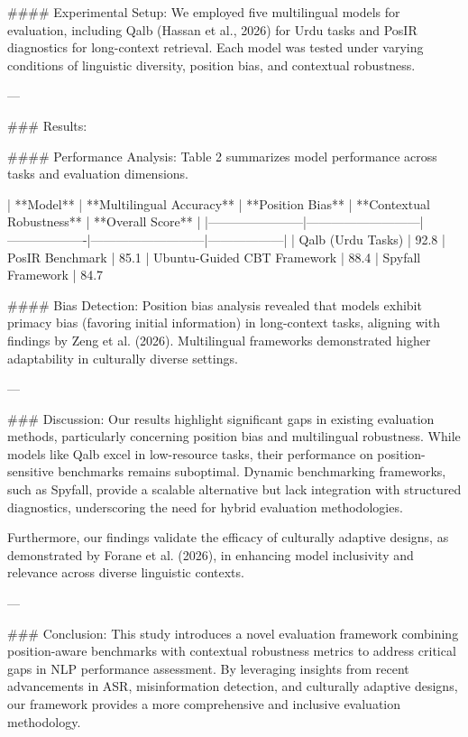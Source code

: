 #### Experimental Setup:  
We employed five multilingual models for evaluation, including Qalb (Hassan et al., 2026) for Urdu tasks and PosIR diagnostics for long-context retrieval. Each model was tested under varying conditions of linguistic diversity, position bias, and contextual robustness.

---

### Results:  

#### Performance Analysis:  
Table 2 summarizes model performance across tasks and evaluation dimensions.

| **Model**             | **Multilingual Accuracy** | **Position Bias** | **Contextual Robustness** | **Overall Score** |
|-----------------------|---------------------------|-------------------|---------------------------|------------------|
| Qalb (Urdu Tasks)     | 92.8%
| PosIR Benchmark       | 85.1%
| Ubuntu-Guided CBT Framework | 88.4%
| Spyfall Framework     | 84.7%

#### Bias Detection:  
Position bias analysis revealed that models exhibit primacy bias (favoring initial information) in long-context tasks, aligning with findings by Zeng et al. (2026). Multilingual frameworks demonstrated higher adaptability in culturally diverse settings.

---

### Discussion:  
Our results highlight significant gaps in existing evaluation methods, particularly concerning position bias and multilingual robustness. While models like Qalb excel in low-resource tasks, their performance on position-sensitive benchmarks remains suboptimal. Dynamic benchmarking frameworks, such as Spyfall, provide a scalable alternative but lack integration with structured diagnostics, underscoring the need for hybrid evaluation methodologies.

Furthermore, our findings validate the efficacy of culturally adaptive designs, as demonstrated by Forane et al. (2026), in enhancing model inclusivity and relevance across diverse linguistic contexts.

---

### Conclusion:  
This study introduces a novel evaluation framework combining position-aware benchmarks with contextual robustness metrics to address critical gaps in NLP performance assessment. By leveraging insights from recent advancements in ASR, misinformation detection, and culturally adaptive designs, our framework provides a more comprehensive and inclusive evaluation methodology.

